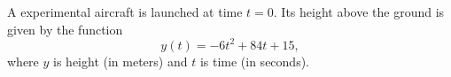 \documentclass[addpoints, 12pt]{exam}
\begin{document}
\begin{questions}

\newpage 

\question[10]
A experimental aircraft is launched at time $t=0$.  Its height above the ground is given by the function \begin{equation*}
	y(t) = -6t^2 + 84t + 15 ,
\end{equation*}
where $y$ is height (in meters) and $t$ is time (in seconds).

\end{questions}
\end{document}
